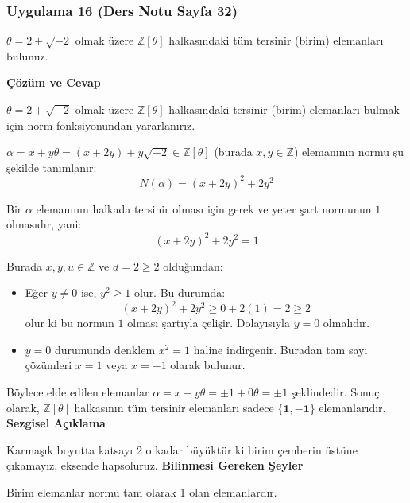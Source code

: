 \documentclass[11pt, a4paper]{article}
\newenvironment{cozum}{
    \vspace{0.5cm}
    \noindent\textcolor{green!60!black}{\faCheckCircle\enspace \textbf{\Large Çözüm ve Cevap}}\par\vspace{0.2cm}
}{}
\newenvironment{sezgisel}{
    \vspace{0.5cm}
    \noindent\textcolor{orange!80!black}{\faLightbulb\enspace \textbf{\Large Sezgisel Açıklama}}\par\vspace{0.2cm}
    \itshape
}{}
\newenvironment{bilgi}{
    \vspace{0.5cm}
    \noindent\textcolor{red!70!black}{\faExclamationTriangle\enspace \textbf{\Large Bilinmesi Gereken Şeyler}}\par\vspace{0.2cm}
}{}
\begin{document}
\subsubsection{Uygulama 16 (Ders Notu Sayfa 32)}
\begin{sorubox}
$\theta = 2 + \sqrt{-2}$ olmak üzere $\mathbb{Z}[\theta]$ halkasındaki tüm tersinir (birim) elemanları bulunuz.
\end{sorubox}
\begin{cozum}
$\theta = 2 + \sqrt{-2}$ olmak üzere $\mathbb{Z}[\theta]$ halkasındaki tersinir (birim) elemanları bulmak için norm fonksiyonundan yararlanırız.

$\alpha = x + y\theta = (x + 2y) + y\sqrt{-2} \in \mathbb{Z}[\theta]$ (burada $x, y \in \mathbb{Z}$) elemanının normu şu şekilde tanımlanır:
\[ N(\alpha) = (x + 2y)^2 + 2 y^2 \]

Bir $\alpha$ elemanının halkada tersinir olması için gerek ve yeter şart normunun $1$ olmasıdır, yani:
\[ (x + 2y)^2 + 2 y^2 = 1 \]

Burada $x, y, u \in \mathbb{Z}$ ve $d = 2 \ge 2$ olduğundan:
\begin{itemize}
    \item Eğer $y \neq 0$ ise, $y^2 \ge 1$ olur. Bu durumda:
    \[ (x + 2y)^2 + 2 y^2 \ge 0 + 2(1) = 2 \ge 2 \]
    olur ki bu normun $1$ olması şartıyla çelişir. Dolayısıyla $y = 0$ olmalıdır.
    \item $y = 0$ durumunda denklem $x^2 = 1$ haline indirgenir. Buradan tam sayı çözümleri $x = 1$ veya $x = -1$ olarak bulunur.
\end{itemize}

Böylece elde edilen elemanlar $\alpha = x + y\theta = \pm 1 + 0\theta = \pm 1$ şeklindedir. Sonuç olarak, $\mathbb{Z}[\theta]$ halkasının tüm tersinir elemanları sadece $\mathbf{\{1, -1\}}$ elemanlarıdır.
\end{cozum}
\begin{sezgisel}
Karmaşık boyutta katsayı 2 o kadar büyüktür ki birim çemberin üstüne çıkamayız, eksende hapsoluruz.
\end{sezgisel}
\begin{bilgi}
Birim elemanlar normu tam olarak 1 olan elemanlardır.
\end{bilgi}

\newpage
\end{document}
